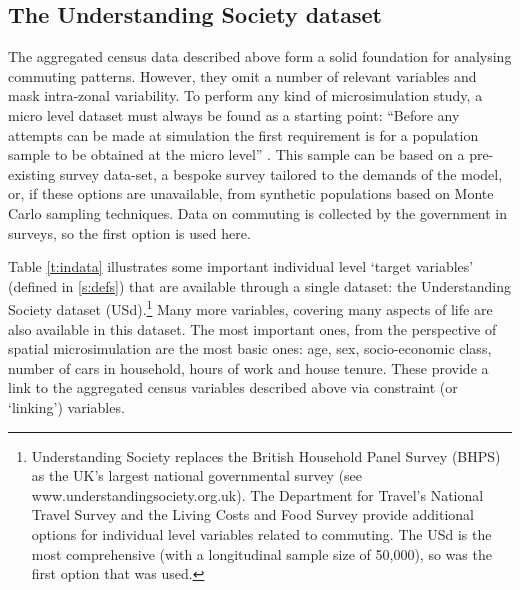 \subsection{The Understanding Society dataset}   \label{sUSD}
The aggregated census data described above form a solid foundation for analysing
commuting patterns. However, they omit a number of relevant variables
and mask intra-zonal variability.
To perform any kind of microsimulation study, a micro level dataset must
always be found as a starting point: ``Before any attempts can be made at
simulation the first requirement is for a population sample to be obtained
at the micro level'' \citep[p.~147]{Holm1987}. This sample
can be based on a pre-existing
survey data-set, a bespoke survey tailored to the demands of the model, or,
if these options are unavailable, from synthetic populations based on Monte
Carlo sampling techniques. Data on commuting is collected by the government in
surveys, so the first option is used here. 

Table \ref{t:indata} illustrates some important individual level `target
variables' (defined in \cref{s:defs}) that are available through a
single dataset: the
Understanding Society dataset 
(USd).\footnote{Understanding
Society replaces the British Household Panel
Survey (BHPS) as the UK's largest national governmental survey (see
www.understandingsociety.org.uk). The Department for Travel's National Travel
Survey and the Living Costs and Food Survey provide additional options for
individual level variables related to commuting. The USd is the most
comprehensive (with a longitudinal sample size of 50,000), so was the first
option that was used.
}
Many more variables, covering many aspects of life are also available in this
dataset. The most important ones, from the perspective of spatial
microsimulation are the most basic ones: age, sex, socio-economic class, number
of cars in household, hours of work and house tenure. These provide a link to
the aggregated census variables described above via constraint (or `linking')
variables. %

